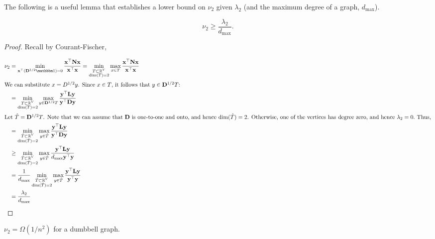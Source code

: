 \documentclass[11pt]{article}
\begin{document}
The following is a useful lemma that establishes a lower bound on $\nu_2$
given $\lambda_2$ (and the maximum degree of a graph, $d_{\max}$).
\begin{lemma}
  \[ \nu_2 \ge \frac{\lambda_2}{d_{\max}}. \]
\end{lemma}

\begin{proof}
  Recall by Courant-Fischer,

  \begin{align*}
  \nu_2 &= \min_{\V{x}^{\top} (\V{D}^{1/2} \ones) = 0}
  \frac{\V{x^{\top} N x}}{\V{x^{\top} x}} = \min_{\substack{T \subset \rea^V\\
  \dim(T) = 2}} \max_{x \in T} \frac{\V{x^{\top} N x}}{\V{x^{\top} x}} \\
  \intertext{We can substitute $x = D^{1/2} y$. Since $x \in T$, it follows that
  $y \in \V{D}^{1/2} T$:}
  &= \min_{\substack{T \subset \rea^V\\ \dim(T) = 2}} \max_{y \in \V{D}^{1/2} T}
  \frac{\V{y^{\top} L y}}{\V{y^{\top} D y}} \\
  \intertext{Let $\hat{T} = \V{D}^{1/2} T$. Note that we can assume that $\V{D}$ is one-to-one and
  onto, and hence $\dim(\hat{T}) = 2$. Otherwise, one of the vertices
    has degree zero, and hence $\lambda_2 = 0.$ Thus,}
  &= \min_{\substack{\hat{T} \subset \rea^V\\ \dim(\hat{T}) = 2}} \max_{y \in \hat{T}} \frac{\V{y^{\top} L y}}{\V{y^{\top} D y}} \\
  &\ge \min_{\substack{\hat{T} \subset \rea^V\\ \dim(\hat{T}) = 2}} \max_{y \in \hat{T}} \frac{\V{y^{\top} L y}}{d_{\max} \V{y^{\top} y}} \\
  &= \frac{1}{d_{\max}} \min_{\substack{\hat{T} \subset \rea^V\\ \dim(\hat{T}) = 2}} \max_{y \in \hat{T}} \frac{\V{y^{\top} L y}}{\V{y^{\top} y}} \\
  &= \frac{\lambda_2}{d_{\max}}
  \end{align*}
\end{proof}

\begin{theorem} 
  $\nu_2 = \Omega(1 / n^2)$ for a dumbbell graph.
\end{theorem}
\end{document}
